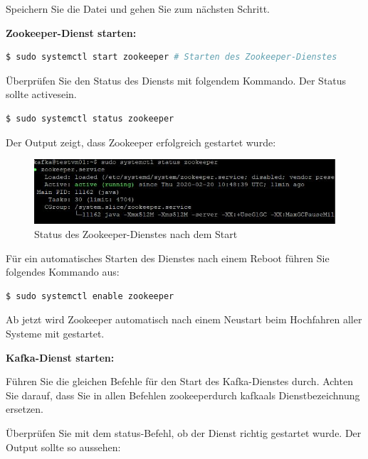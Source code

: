 \documentclass[a4paper,titlepage,halfparskip,12pt]{scrreprt}
\begin{document}
Speichern Sie die Datei und gehen Sie zum nächsten Schritt.

\textbf{Zookeeper-Dienst starten:}

\bigskip

\begin{lstlisting}[language=Bash]
$ sudo systemctl start zookeeper # Starten des Zookeeper-Dienstes
\end{lstlisting}

Überprüfen Sie den Status des Diensts mit folgendem Kommando. Der Status sollte \glqq active\grqq sein.

\smallskip

\begin{lstlisting}[language=Bash]
$ sudo systemctl status zookeeper
\end{lstlisting}

Der Output zeigt, dass Zookeeper erfolgreich gestartet wurde:

\begin{figure}[h]
	\centering
	\includegraphics{images/StatusZookeeper}
	\caption{Status des Zookeeper-Dienstes nach dem Start}
	\label{img:StatusZookeeper}
\end{figure}

Für ein automatisches Starten des Dienstes nach einem Reboot führen Sie folgendes Kommando aus:

\smallskip

\begin{lstlisting}[language=Bash]
$ sudo systemctl enable zookeeper
\end{lstlisting}

Ab jetzt wird Zookeeper automatisch nach einem Neustart beim Hochfahren aller Systeme mit gestartet.

\pagebreak

\textbf{Kafka-Dienst starten:}

\bigskip

Führen Sie die gleichen Befehle für den Start des Kafka-Dienstes durch. Achten Sie darauf, dass Sie in allen Befehlen \glqq zookeeper\grqq durch \glqq kafka\grqq als Dienstbezeichnung ersetzen.

\smallskip

Überprüfen Sie mit dem \glqq status\grqq -Befehl, ob der Dienst richtig gestartet wurde. Der Output sollte so aussehen:
\end{document}
